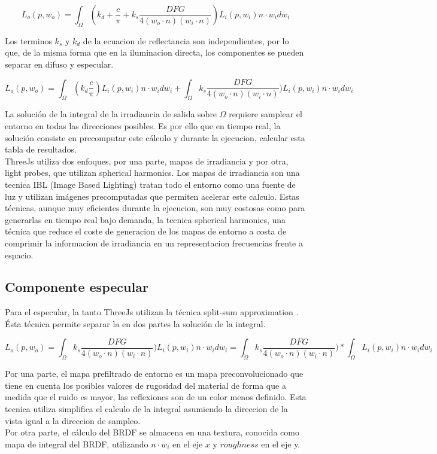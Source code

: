 $$
L_o(p, w_o) = \int_{\Omega} (k_d + \frac{c}{\pi} + 
k_s \frac{DFG}{4(w_o\cdot{n})(w_i\cdot{n})})L_i(p, w_i)n\cdot{w_i}dw_i
$$

Los terminos $k_s$ y $k_d$ de la ecuacion de reflectancia son independientes, por lo que, de la
misma forma que en la iluminacion directa, los componentes se pueden separar en difuso y
especular.

$$
L_o(p, w_o) = \int_{\Omega}
(k_d \frac{c}{\pi}) L_i(p, w_i)n\cdot{w_i}dw_i +
\int_{\Omega} 
k_s \frac{DFG}{4(w_o\cdot{n})(w_i\cdot{n})})L_i(p, w_i)n\cdot{w_i}dw_i
$$

La soluci\'on de la integral de la irradiancia de salida sobre $\Omega$ requiere samplear el entorno
en todas las direcciones posibles. Es por ello que en tiempo real, la soluci\'on consiste en
precomputar este c\'alculo y durante la ejecucion, calcular esta tabla de resultados.\\
ThreeJs utiliza dos enfoques, por una parte, mapas de irradiancia y por otra, light probes, que
utilizan spherical harmonics. Los mapas de irradiancia son una tecnica IBL (Image Based Lighting)
tratan todo el entorno como una fuente de luz y utilizan im\'agenes precomputadas que permiten
acelerar este calculo. Estas t\'ecnicas, aunque muy eficientes durante la ejecucion, son muy
costosas como para generarlas en tiempo real bajo demanda, la tecnica spherical harmonics, una
t\'ecnica que reduce el coste de generacion de los mapas de entorno a costa de comprimir la
informacion de irradiancia en un representacion frecuencias frente a espacio.

\subsection{Componente especular}
Para el especular, la tanto ThreeJs utilizan la t\'ecnica split-sum approximation
\autocite{splitsum}. \'Esta t\'ecnica permite separar la en dos partes la soluci\'on de la
integral.

$$
L_o(p, w_o) =
\int_{\Omega} 
  k_s \frac{DFG}{4(w_o\cdot{n})(w_i\cdot{n})})L_i(p, w_i)n\cdot{w_i}dw_i =
\int_{\Omega} k_s \frac{DFG}{4(w_o\cdot{n})(w_i\cdot{n})}) *
\int_{\Omega}L_i(p, w_i)n\cdot{w_i}dw_i
$$

Por una parte, el mapa prefiltrado de entorno es un mapa preconvolucionado que tiene en cuenta
los posibles valores de rugosidad del material de forma que a medida que el ruido es mayor, las
reflexiones son de un color menos definido. Esta tecnica utiliza simplifica el calculo de
la integral asumiendo la direccion de la vista igual a la direccion de sampleo.\\
Por otra parte, el c\'alculo del BRDF se almacena en una textura, conocida como mapa de integral
del BRDF, utilizando $n\cdot{w_i}$ en el eje $x$ y $roughness$ en el eje y.

